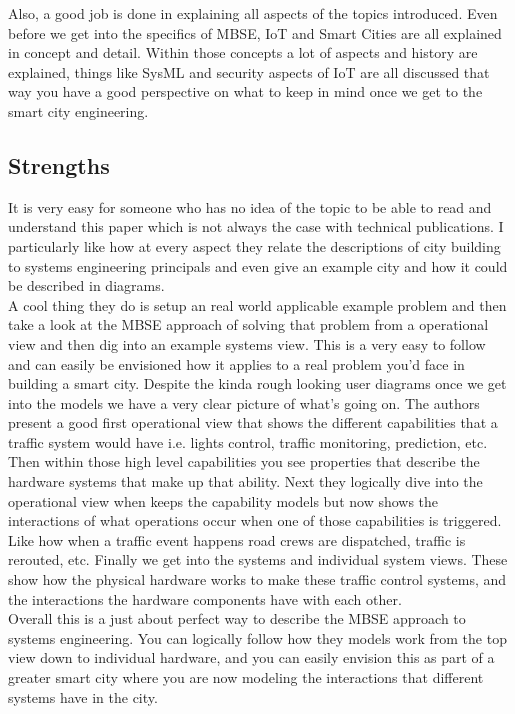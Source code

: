 \documentclass[11pt]{asme2ej}
\begin{document}
Also, a good job is done in explaining all aspects of the topics introduced. 
Even before we get into the specifics of MBSE, IoT and Smart Cities are all explained in concept and detail.
Within those concepts a lot of aspects and history are explained, things like SysML and security aspects of IoT are all discussed that way you have a good perspective on what to keep in mind once we get to the smart city engineering.


\subsection{Strengths}

It is very easy for someone who has no idea of the topic to be able to read and understand this paper which is not always the case with technical publications. 
I particularly like how at every aspect they relate the descriptions of city building to systems engineering principals and even give an example city and how it could be described in diagrams.\\

A cool thing they do is setup an real world applicable example problem and then take a look at the MBSE approach of solving that problem from a operational view and then dig into an example systems view. 
This is a very easy to follow and can easily be envisioned how it applies to a real problem you'd face in building a smart city.
Despite the kinda rough looking user diagrams once we get into the models we have a very clear picture of what's going on. 
The authors present a good first operational view that shows the different capabilities that a traffic system would have i.e. lights control, traffic monitoring, prediction, etc. 
Then within those high level capabilities you see properties that describe the hardware systems that make up that ability.
Next they logically dive into the operational view when keeps the capability models but now shows the interactions of what operations occur when one of those capabilities is triggered.
Like how when a traffic event happens road crews are dispatched, traffic is rerouted, etc.
Finally we get into the systems and individual system views. 
These show how the physical hardware works to make these traffic control systems, and the interactions the hardware components have with each other.\\

Overall this is a just about perfect way to describe the MBSE approach to systems engineering.
You can logically follow how they models work from the top view down to individual hardware, and you can easily envision this as part of a greater smart city where you are now modeling the interactions that different systems have in the city.
\end{document}
